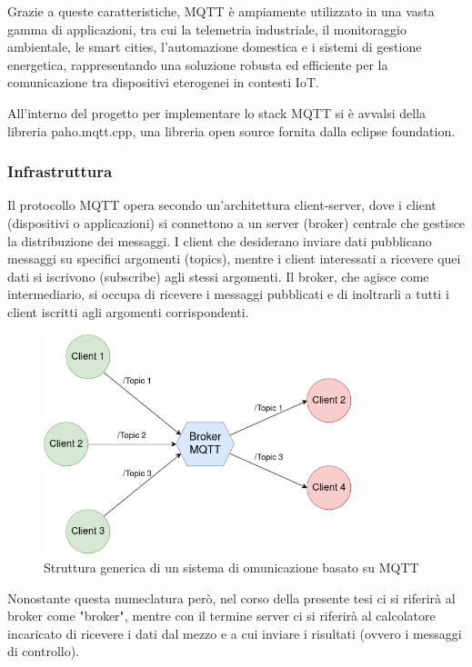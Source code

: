\noindent Grazie a queste caratteristiche, MQTT è ampiamente utilizzato in una vasta gamma di applicazioni, tra cui la telemetria industriale, il monitoraggio ambientale, le smart cities, l'automazione domestica e i sistemi di gestione energetica, rappresentando una soluzione robusta ed efficiente per la comunicazione tra dispositivi eterogenei in contesti IoT.

\noindent All'interno del progetto per implementare lo stack MQTT si è avvalsi della libreria paho.mqtt.cpp\cite{paho_cpp}, una libreria open source fornita dalla eclipse foundation.

\subsubsection{Infrastruttura}
\noindent Il protocollo MQTT opera secondo un'architettura client-server, dove i client (dispositivi o applicazioni) si connettono a un server (broker) centrale che gestisce la distribuzione dei messaggi. I client che desiderano inviare dati pubblicano messaggi su specifici argomenti (topics), mentre i client interessati a ricevere quei dati si iscrivono (subscribe) agli stessi argomenti. Il broker, che agisce come intermediario, si occupa di ricevere i messaggi pubblicati e di inoltrarli a tutti i client iscritti agli argomenti corrispondenti.

\begin{figure}[H]
  \centering
  \includegraphics[width=0.8\textwidth]{figures/mqtt_structure.png}
  \caption{Struttura generica di un sistema di omunicazione basato su MQTT}
  \label{mqtt_structure}
\end{figure}

\noindent Nonostante questa numeclatura però, nel corso della presente tesi ci si riferirà al broker come "broker", mentre con il termine server ci si riferirà al calcolatore incaricato di ricevere i dati dal mezzo e a cui inviare i risultati (ovvero i messaggi di controllo).

